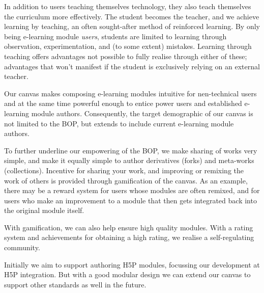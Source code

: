 In addition to users teaching themselves technology, they also teach 
themselves the curriculum more effectively. The student becomes the teacher, 
and we achieve learning by teaching, an often sought-after method of 
reinforced learning. By only being e-learning module \emph{users}, students 
are limited to learning through observation, experimentation, and (to some 
extent) mistakes. Learning through teaching offers advantages not possible to 
fully realise through either of these; advantages that won't manifest if the 
student is exclusively relying on an external 
teacher\cite{cortese2005learning}.

Our canvas makes composing e-learning modules intuitive for nen-technical 
users and at the same time powerful enough to entice power users and 
established e-learning module authors. Consequently, the target demographic of 
our canvas is not limited to the BOP, but extends to include current 
e-learning module authors.

To further underline our empowering of the BOP, we make sharing of works very 
simple, and make it equally simple to author derivatives (forks) and 
meta-works (collections). Incentive for sharing your work, and improving or 
remixing the work of others is provided through gamification of the canvas. As 
an example, there may be a reward system for users whose modules are often 
remixed, and for users who make an improvement to a module that then gets 
integrated back into the original module itself.

With gamification, we can also help ensure high quality modules. With a rating 
system and achievements for obtaining a high rating, we realise a 
self-regulating community.

Initially we aim to support authoring H5P modules, focussing our development 
at H5P integration. But with a good modular design we can extend our canvas to 
support other standards as well in the future.

